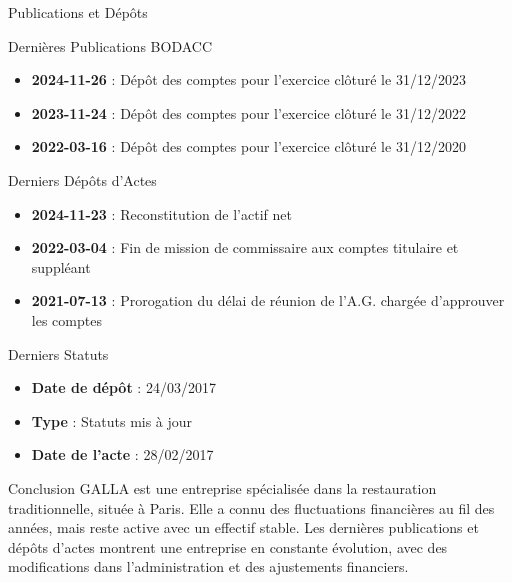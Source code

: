 \begin{frame}{Publications et Dépôts}
\label{publications-et-duxe9puxf4ts}
\begin{block}{Dernières Publications BODACC}
\label{derniuxe8res-publications-bodacc}
\begin{itemize}
\tightlist
\item
  \textbf{2024-11-26} : Dépôt des comptes pour l'exercice clôturé le
  31/12/2023
\item
  \textbf{2023-11-24} : Dépôt des comptes pour l'exercice clôturé le
  31/12/2022
\item
  \textbf{2022-03-16} : Dépôt des comptes pour l'exercice clôturé le
  31/12/2020
\end{itemize}
\end{block}

\begin{block}{Derniers Dépôts d'Actes}
\label{derniers-duxe9puxf4ts-dactes}
\begin{itemize}
\tightlist
\item
  \textbf{2024-11-23} : Reconstitution de l'actif net
\item
  \textbf{2022-03-04} : Fin de mission de commissaire aux comptes
  titulaire et suppléant
\item
  \textbf{2021-07-13} : Prorogation du délai de réunion de l'A.G.
  chargée d'approuver les comptes
\end{itemize}
\end{block}
\end{frame}

\begin{frame}{Derniers Statuts}
\label{derniers-statuts}
\begin{itemize}
\tightlist
\item
  \textbf{Date de dépôt} : 24/03/2017
\item
  \textbf{Type} : Statuts mis à jour
\item
  \textbf{Date de l'acte} : 28/02/2017
\end{itemize}
\end{frame}

\begin{frame}{Conclusion}
\label{conclusion}
GALLA est une entreprise spécialisée dans la restauration
traditionnelle, située à Paris. Elle a connu des fluctuations
financières au fil des années, mais reste active avec un effectif
stable. Les dernières publications et dépôts d'actes montrent une
entreprise en constante évolution, avec des modifications dans
l'administration et des ajustements financiers.
\end{frame}
